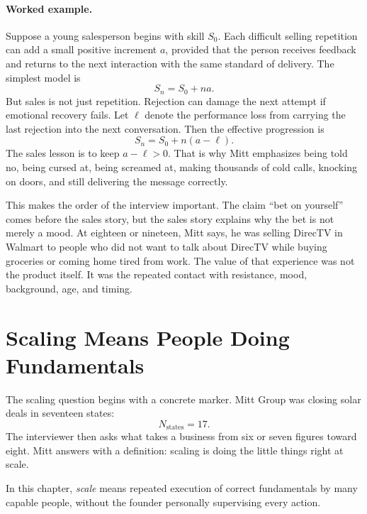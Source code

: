 \paragraph{Worked example.}
Suppose a young salesperson begins with skill \(S_0\). Each difficult selling repetition can add a small positive increment \(a\), provided that the person receives feedback and returns to the next interaction with the same standard of delivery. The simplest model is
\begin{equation}
S_n=S_0+na.
\end{equation}
But sales is not just repetition. Rejection can damage the next attempt if emotional recovery fails. Let \(\ell\) denote the performance loss from carrying the last rejection into the next conversation. Then the effective progression is
\begin{equation}
S_n=S_0+n(a-\ell).
\end{equation}
The sales lesson is to keep \(a-\ell>0\). That is why Mitt emphasizes being told no, being cursed at, being screamed at, making thousands of cold calls, knocking on doors, and still delivering the message correctly.

This makes the order of the interview important. The claim ``bet on yourself'' comes before the sales story, but the sales story explains why the bet is not merely a mood. At eighteen or nineteen, Mitt says, he was selling DirecTV in Walmart to people who did not want to talk about DirecTV while buying groceries or coming home tired from work. The value of that experience was not the product itself. It was the repeated contact with resistance, mood, background, age, and timing.

\section{Scaling Means People Doing Fundamentals}

The scaling question begins with a concrete marker. Mitt Group was closing solar deals in seventeen states:
\begin{equation}
N_{\text{states}}=17.
\end{equation}
The interviewer then asks what takes a business from six or seven figures toward eight. Mitt answers with a definition: scaling is doing the little things right at scale.

\begin{definition}
In this chapter, \emph{scale} means repeated execution of correct fundamentals by many capable people, without the founder personally supervising every action.
\end{definition}

